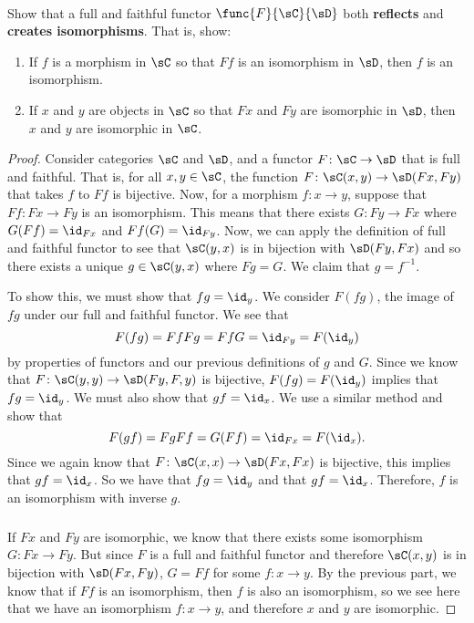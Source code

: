 \documentclass[../../main]{subfiles}
\begin{document}
\paragraph{}
\begin{exercise}
	Show that a full and faithful functor \(\func{F}{\sC}{\sD}\) both
	\textbf{reflects} and \textbf{creates isomorphisms}. That is, show:
	\begin{enumerate}
		\item If \(f\) is a morphism in \(\sC\) so that \(Ff\) is an isomorphism
			in \(\sD\), then \(f\) is an isomorphism.

		\item If \(x\) and \(y\) are objects in \(\sC\) so that \(Fx\) and
			\(Fy\) are isomorphic in \(\sD\), then \(x\) and \(y\) are
			isomorphic in \(\sC\).
	\end{enumerate}
\end{exercise}
\begin{proof}
	Consider categories $\sC$ and $\sD$, and a functor $F\colon \sC \rightarrow \sD$ that is
	full and faithful. That is, for all $x,y \in \sC$, the function $F\colon \sC(x,y)
	\rightarrow \sD(Fx,Fy)$ that takes $f$ to $Ff$ is bijective. Now, for a
	morphism $f\colon x\rightarrow y$, suppose that $Ff\colon Fx \rightarrow Fy$ is an
	isomorphism. This means that there exists $G\colon Fy \rightarrow Fx$ where
	$G(Ff) = \id_{Fx}$ and $Ff(G) = \id_{Fy}$. Now, we can apply the definition of
	full and faithful functor to see that $\sC(y,x)$ is in bijection with
	$\sD(Fy,Fx)$ and so there exists a unique $g \in \sC(y,x)$ where $Fg = G$. We
	claim that $g = f^{-1}$.

	To show this, we must show that $fg = \id_y$. We consider $F(fg)$, the image
	of $fg$ under our full and faithful functor. We see that
	$$ F(fg) = FfFg = FfG = \id_{Fy} = F(\id_y)$$
	by properties of functors and our previous definitions of $g$ and $G$. Since
	we know that $F\colon \sC(y,y) \rightarrow \sD(Fy,F,y)$ is bijective, $F(fg) =
	F(\id_y)$ implies that $fg = \id_y$. We must also show that $gf = \id_x$. We
	use a similar method and show that
	$$F(gf) = FgFf = G(Ff) = \id_{Fx} = F(\id_x).$$
	Since we again know that $F\colon \sC(x,x) \rightarrow \sD(Fx,Fx)$ is bijective, this
	implies that $gf = \id_x$. So we have that $fg = \id_y$ and that $gf = \id_x$.
	Therefore, $f$ is an isomorphism with inverse $g$.

	\subparagraph{}
	If $Fx$ and $Fy$ are isomorphic, we know that there exists some isomorphism
	$G\colon Fx \rightarrow Fy$. But since $F$ is a full and faithful functor
	and therefore $\sC(x,y)$ is in bijection with $\sD(Fx,Fy)$, $G = Ff$ for
	some $f\colon x \rightarrow y$. By the previous part, we know that if $Ff$
	is an isomorphism, then $f$ is also an isomorphism, so we see here that we
	have an isomorphism $f\colon x \rightarrow y$, and therefore $x$ and $y$ are
	isomorphic.
\end{proof}
\end{document}

